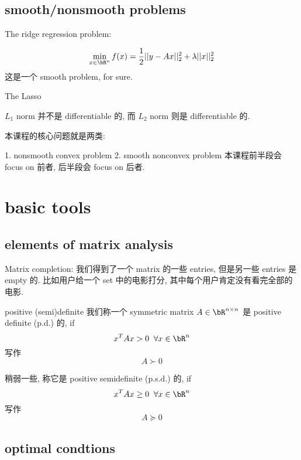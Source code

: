 \documentclass[lang=cn,11pt]{elegantbook}
\begin{document}
\section{smooth/nonsmooth problems}

The ridge regression problem:

\[
\min_{x\in \bR^n} f(x) = \frac{1}{2} ||y - Ax||_2^2 + \lambda ||x||_2^2
\]
这是一个 smooth problem, for sure. 

The Lasso 


$L_1$ norm 并不是 differentiable 的, 而 $L_2$ norm 则是 differentiable 的.     



本课程的核心问题就是两类:

1. nonsmooth convex problem
2. smooth nonconvex problem
本课程前半段会 focus on 前者, 后半段会 focus on 后者.











\chapter{basic tools}
\section{elements of matrix analysis}

\begin{example}
Matrix completion: 我们得到了一个 matrix 的一些 entries, 但是另一些 entries 是 empty 的. 比如用户给一个 set 中的电影打分, 其中每个用户肯定没有看完全部的电影.



\begin{definition}{positive (semi)definite}
我们称一个 symmetric matrix $A \in \bR^{n\times n}$ 是 positive definite (p.d.) 的, if 
$$x^T Ax >0   \;\; \forall x\in \bR^n$$  写作 $$
A \succ 0 
$$

稍弱一些, 称它是 positive semidefinite (p.s.d.) 的, if
$$
x^T A x \geq 0 \;\; \forall x\in\bR^n
$$写作 
$$
A \succeq 0
$$

\end{definition}

\end{example}



\section{optimal condtions}
\end{document}
